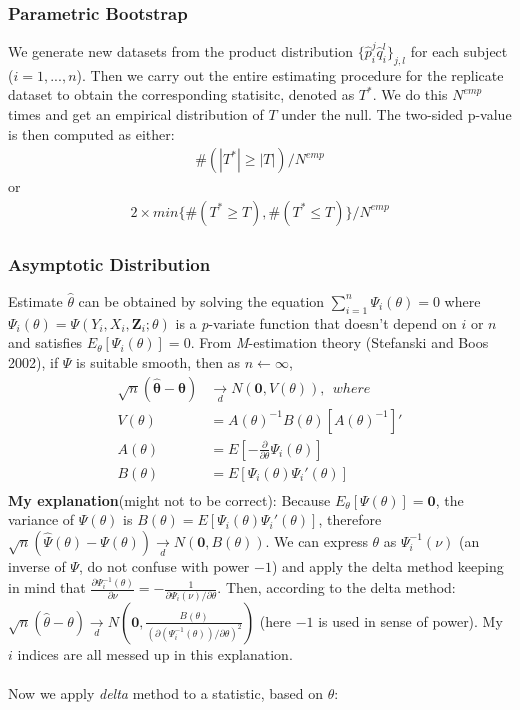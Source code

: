 \documentclass[]{article}
\begin{document}
\subsubsection{Parametric Bootstrap}
We generate new datasets from the product distribution $\{\hat{p}_i^j\hat{q}_i^l\}_{j,l}$ for each subject ($i=1,...,n$). Then we carry out the entire estimating procedure for the replicate dataset to obtain the corresponding statisitc, denoted as $T^*$. We do this $N^{emp}$ times and get an empirical distribution of $T$ under the null. The two-sided p-value is then computed as either:
$$
\begin{aligned}
	\#(|T^*|\geq |T|)/N^{emp}
\end{aligned}
$$
or
$$
\begin{aligned}
	2\times min\{\#(T^*\geq T),\#(T^*\leq T)\}/N^{emp}
\end{aligned}
$$
\subsubsection{Asymptotic Distribution}
Estimate $\hat{\theta}$ can be obtained by solving the equation $\sum_{i=1}^n \Psi_i(\theta) = 0$ where $\Psi_i(\theta) = \Psi(Y_i, X_i, \pmb{Z}_i; \theta)$ is a \emph{p}-variate function that doesn't depend on $i$ or $n$ and satisfies $E_{\theta}[\Psi_i(\theta)]=0$. From \emph{M}-estimation theory (Stefanski and Boos 2002)\cite{stefanski2002calculus}, if $\Psi$ is suitable smooth, then as $n\leftarrow \infty$,
$$
\begin{aligned}
	\sqrt{n}(\hat{\pmb{\theta}} - \pmb{\theta}) &\underset{d}{\longrightarrow}N(\pmb{0}, V(\theta)),~~where\\
	  V(\theta) &= A(\theta)^{-1} B(\theta)[A(\theta)^{-1}]'\\
		A(\theta) &= E \left[-\frac{\partial}{\partial \theta} \Psi_i(\theta)\right]\\
		B(\theta) &= E \left[\Psi_i(\theta)\Psi_i'(\theta)\right]\\
\end{aligned}
$$
 {\scriptsize{\textbf{My explanation}(might not to be correct): Because $E_{\theta}[\Psi(\theta)]=\pmb{0}$}, the variance of $\Psi(\theta)$ is $B(\theta) = E \left[\Psi_i(\theta)\Psi_i'(\theta)\right]$, therefore $\sqrt{n}(\hat{\Psi}(\theta) - \Psi(\theta)) \underset{d}{\longrightarrow}N(\pmb{0}, B(\theta))$. We can express $\theta$ as $\Psi^{-1}_i(\nu)$ (an inverse of $\Psi$, do not confuse with power $-1$) and apply the delta method keeping in mind that $\frac{\partial \Psi^{-1}_i(\theta)}{\partial \nu} = -\frac{1}{\partial \Psi_i(\nu)/ \partial \theta}$. Then, according to the delta method: $\sqrt{n}(\hat{\theta} - \theta) \underset{d}{\longrightarrow}N\left(\pmb{0}, \frac{B(\theta)}{(\partial (\Psi^{-1}_i(\theta)) /\partial \theta)^2}\right)$ (here $-1$ is used in sense of power). My $i$ indices are all messed up in this explanation.
 }\\
 ~\\
Now we apply \emph{delta} method to a statistic, based on $\theta$:
\end{document}
